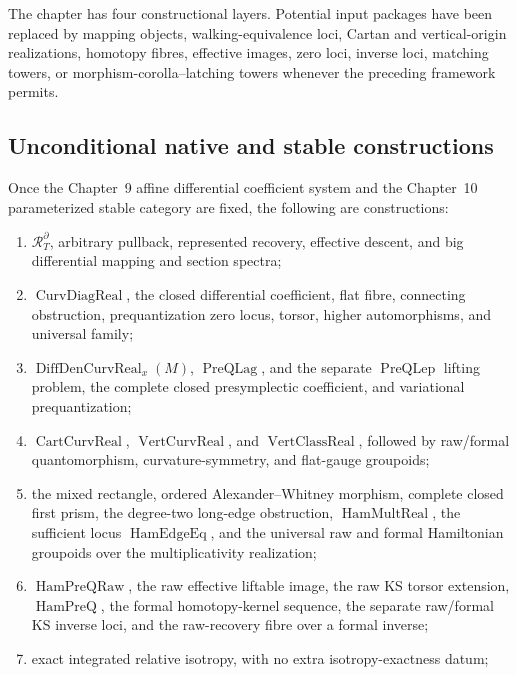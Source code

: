 The chapter has four constructional layers.  Potential input packages have been
replaced by mapping objects, walking-equivalence loci, Cartan and vertical-origin
realizations, homotopy fibres, effective images, zero loci, inverse loci, matching
towers, or morphism-corolla--latching towers whenever the preceding framework
permits.

\subsection{Unconditional native and stable constructions}
\label{subsec:prequantum-audit-native}

Once the Chapter~9 affine differential coefficient system and the Chapter~10
parameterized stable category are fixed, the following are constructions:
\begin{enumerate}
\item $\mathcal R_T^{\partial}$, arbitrary pullback, represented recovery,
      effective descent, and big differential mapping and section spectra;
\item $\operatorname{CurvDiagReal}$, the closed differential coefficient, flat
      fibre, connecting obstruction, prequantization zero locus, torsor, higher
      automorphisms, and universal family;
\item $\operatorname{DiffDenCurvReal}_x(M)$,
      $\operatorname{PreQLag}$, and the separate
      $\operatorname{PreQLep}$ lifting problem, the complete closed
      presymplectic coefficient, and variational prequantization;
\item $\operatorname{CartCurvReal}$, $\operatorname{VertCurvReal}$, and
      $\operatorname{VertClassReal}$, followed by
      raw/formal quantomorphism, curvature-symmetry, and flat-gauge groupoids;
\item the mixed rectangle, ordered Alexander--Whitney morphism, complete closed
      first prism, the degree-two long-edge obstruction,
      $\operatorname{HamMultReal}$, the sufficient locus
      $\operatorname{HamEdgeEq}$, and the universal raw and formal Hamiltonian
      groupoids over the multiplicativity realization;
\item $\operatorname{HamPreQRaw}$, the raw effective liftable image, the raw KS
      torsor extension, $\operatorname{HamPreQ}$, the formal homotopy-kernel
      sequence, the separate raw/formal KS inverse loci, and the raw-recovery
      fibre over a formal inverse;
\item exact integrated relative isotropy, with no extra isotropy-exactness datum;

\end{enumerate}
